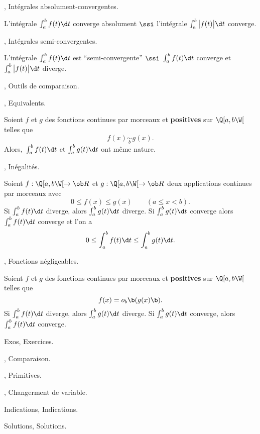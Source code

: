 , Intégrales absolument-convergentes.

\Propriete L'intégrale $\int_a^bf(t)\d t$ converge absolument $\ssi$ l'intégrale $\int_a^b\big|f(t)\big|\d t$ converge. 

, Intégrales semi-convergentes.

\Propriete L'intégrale $\int_a^bf(t)\d t$ est ``semi-convergente'' $\ssi$ $\int_a^bf(t)\d t$ converge et $\int_a^b\big|f(t)\big|\d t$ diverge.


, Outils de comparaison.

, Equivalents.

\Theoreme [$a\in\ob R$ et $b>a$ un élément de $\ol R$] 
Soient $f$ et $g$ des fonctions continues par morceaux et {\bf positives} sur $\Q[a,b\W[$ telles que 
$$
f(x)\mathop{\sim}\limits_bg(x).
$$ 
Alors,~$\int_a^bf(t)\d t$ et $\int_a^bg(t)\d t$ ont même nature. 

, Inégalités.

\Propriete [$a\in\ob R$, $b>a$ un élément de $\ol R$] 
Soient $f:\Q[a,b\W[\to\ob R$ et $g:\Q[a,b\W[\to\ob R$ deux applications continues par morceaux avec  
$$
0\le f(x)\le g(x)\qquad (a\le x<b). 
$$
Si $\int_a^bf(t)\d t$ diverge, alors $\int_a^bg(t)\d t$ diverge. \medskip\noindent
Si $\int_a^bg(t)\d t$ converge alors $\int_a^bf(t)\d t$ converge et l'on a 
$$
0\le \int_a^bf(t)\d t\le \int_a^bg(t)\d t. 
$$ 

, Fonctions négligeables.

\Theoreme 
[$a\in\ob R$ et $b>a$ élément de $\ol R$]
Soient  $f$ et $g$ des fonctions continues par morceaux et {\bf positives} sur $\Q[a,b\W[$ telles que 
$$
f(x)=o_b\b(g(x)\b).
$$ 
Si $\int_a^b f(t)\d t$ diverge, alors $\int_a^bg(t)\d t$ diverge. \pn
Si $\int_a^b g(t)\d t$ converge, alors $\int_a^bf(t)\d t$ converge.  

\goodbreak

\Chapter Exos, Exercices.

, Comparaison.

\vfill
{}
\vfill
{}
\vfill
{}
\vfill
{}
\vfill
{}
\vfill
{}
\vfill
{}
\vfill
{}
\vfill
{}
\vfill
{}

, Primitives.

\vfill
{}
\vfill
{}
\vfill
{}

, Changerment de variable.

\vfill
{}
\vfill
{}







% 
\Chapter Indications, Indications.
% 
 \LD@Exo@Indication@Display
% 
% 
\LD@Exo@Notion@Display

\Chapter Solutions, Solutions.

\LD@Exo@Sol@Display

\bye